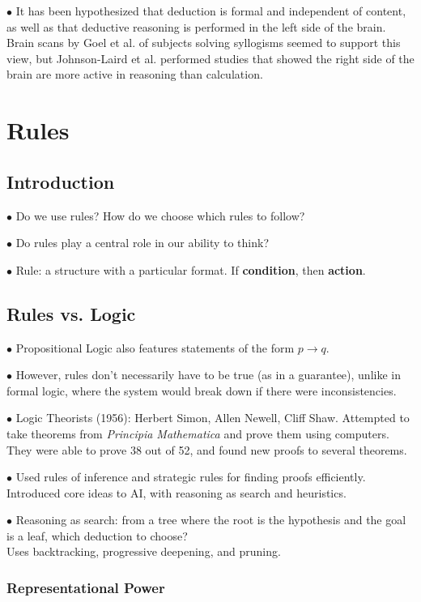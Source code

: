 \documentclass[english,openany]{book}
\begin{document}
$\bullet$ It has been hypothesized that deduction is formal and independent of content, as well as that deductive reasoning is performed in the left side of the brain. Brain scans by Goel et al. of subjects solving syllogisms seemed to support this view, but Johnson-Laird et al. performed studies that showed the right side of the brain are more active in reasoning than calculation.

\chapter{Rules}

\section{Introduction}

$\bullet$ Do we use rules? How do we choose which rules to follow?

$\bullet$ Do rules play a central role in our ability to think?

$\bullet$ Rule: a structure with a particular format. If \textbf{condition}, then \textbf{action}.

\section{Rules vs. Logic}

$\bullet$ Propositional Logic also features statements of the form $p \rightarrow q$.

$\bullet$ However, rules don't necessarily have to be true (as in a guarantee), unlike in formal logic, where the system would break down if there were inconsistencies.

$\bullet$ Logic Theorists (1956): Herbert Simon, Allen Newell, Cliff Shaw. Attempted to take theorems from \textit{Principia Mathematica} and prove them using computers. They were able to prove 38 out of 52, and found new proofs to several theorems.

$\bullet$ Used rules of inference and strategic rules for finding proofs efficiently. Introduced core ideas to AI, with reasoning as search and heuristics.

$\bullet$ Reasoning as search: from a tree where the root is the hypothesis and the goal is a leaf, which deduction to choose?\\ Uses backtracking, progressive deepening, and pruning.

\subsection{Representational Power}
\end{document}
